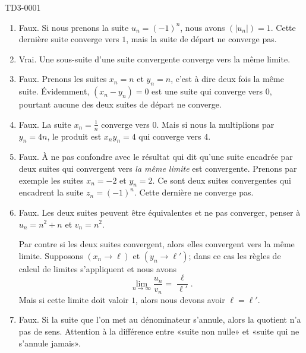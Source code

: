 \begin{corrige}{TD3-0001}
\begin{enumerate}
		\item
			Faux. Si nous prenons la suite $u_n=(-1)^n$, nous avons $(| u_n |)=1$. Cette dernière suite converge vers $1$, mais la suite de départ ne converge pas.
		\item
			Vrai. Une sous-suite d'une suite convergente converge vers la même limite.
		\item
			Faux. Prenons les suites $x_n=n$ et $y_n=n$, c'est à dire deux fois la même suite. Évidemment, $(x_n-y_n)=0$ est une suite qui converge vers $0$, pourtant aucune des deux suites de départ ne converge.
		\item
			Faux. La suite $x_n=\frac{1}{ n }$ converge vers $0$. Mais si nous la multiplions par $y_n=4n$, le produit est $x_ny_n=4$ qui converge vers $4$.
		\item
			Faux. À ne pas confondre avec le résultat qui dit qu'une suite encadrée par deux suites qui convergent vers \emph{la même limite} est convergente. Prenons par exemple les suites $x_n=-2$ et $y_n=2$. Ce sont deux suites convergentes qui encadrent la suite $z_n=(-1)^n$. Cette dernière ne converge pas.
		\item
            Faux. Les deux suites peuvent être équivalentes et ne pas converger, penser à \( u_n=n^2+n\) et \( v_n=n^2\). 

            Par contre si les deux suites convergent, alors elles convergent vers la même limite. Supposons $(x_n\to\ell)$ et $(y_n\to\ell')$; dans ce cas les règles de calcul de limites s'appliquent et nous avons
			\begin{equation}
                \lim_{n\to \infty} \frac{ u_n }{ v_n }=\frac{ \ell }{ \ell' }.
			\end{equation}
            Mais si cette limite doit valoir \( 1\), alors nous devons avoir \( \ell=\ell'\).
		\item
			Faux. Si la suite que l'on met au dénominateur s'annule, alors la quotient n'a pas de sens. Attention à la différence entre «suite non nulle» et «suite qui ne s'annule jamais».
	\end{enumerate}

\end{corrige}
